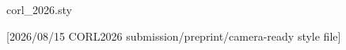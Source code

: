 \begin{filecontents*}[overwrite]{corl_2026.sty}
%
%
%
%
% 


[2026/08/15 CORL2026 submission/preprint/camera-ready style file]
\newcommand{\@conferenceordinal}{10th}
\newcommand{\@conferenceyear}{2026}
\newcommand{\@conferencelocation}{Austin TX, USA}




\end{filecontents*}

